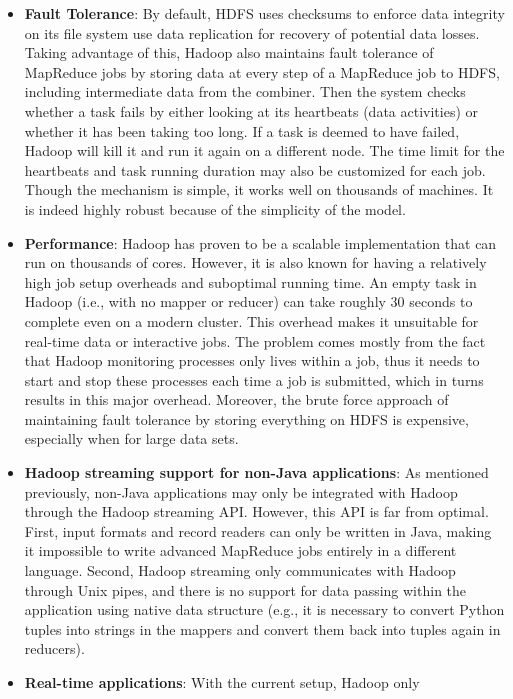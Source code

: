 \documentclass[]{krantz}
\begin{document}
\begin{itemize}
\item
  \textbf{Fault Tolerance}: By default, HDFS uses checksums to enforce
  data integrity on its file system use data replication for recovery of
  potential data losses. Taking advantage of this, Hadoop also maintains
  fault tolerance of MapReduce jobs by storing data at every step of a
  MapReduce job to HDFS, including intermediate data from the combiner.
  Then the system checks whether a task fails by either looking at its
  heartbeats (data activities) or whether it has been taking too long.
  If a task is deemed to have failed, Hadoop will kill it and run it
  again on a different node. The time limit for the heartbeats and task
  running duration may also be customized for each job. Though the
  mechanism is simple, it works well on thousands of machines. It is
  indeed highly robust because of the simplicity of the model.
\item
  \textbf{Performance}: Hadoop has proven to be a scalable
  implementation that can run on thousands of cores. However, it is also
  known for having a relatively high job setup overheads and suboptimal
  running time. An empty task in Hadoop (i.e., with no mapper or
  reducer) can take roughly 30 seconds to complete even on a modern
  cluster. This overhead makes it unsuitable for real-time data or
  interactive jobs. The problem comes mostly from the fact that Hadoop
  monitoring processes only lives within a job, thus it needs to start
  and stop these processes each time a job is submitted, which in turns
  results in this major overhead. Moreover, the brute force approach of
  maintaining fault tolerance by storing everything on HDFS is
  expensive, especially when for large data sets.
\item
  \textbf{Hadoop streaming support for non-Java applications}: As
  mentioned previously, non-Java applications may only be integrated
  with Hadoop through the Hadoop streaming API. However, this API is far
  from optimal. First, input formats and record readers can only be
  written in Java, making it impossible to write advanced MapReduce jobs
  entirely in a different language. Second, Hadoop streaming only
  communicates with Hadoop through Unix pipes, and there is no support
  for data passing within the application using native data structure
  (e.g., it is necessary to convert Python tuples into strings in the
  mappers and convert them back into tuples again in reducers).
\item
  \textbf{Real-time applications}: With the current setup, Hadoop only

\end{itemize}
\end{document}
